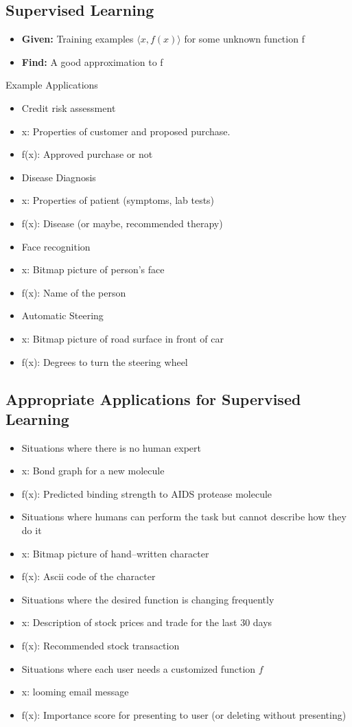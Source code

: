 \subsection{Supervised Learning}
\begin{itemize}
  \item \textbf{Given:} Training examples $\langle x,f(x)\rangle$ for some unknown function f
  \item \textbf{Find:} A good approximation to f
\end{itemize}
Example Applications
\begin{itemize}
  \item Credit risk assessment
  \item[] x: Properties of customer and proposed purchase.
  \item[] f(x): Approved purchase or not
  \item Disease Diagnosis
  \item[] x: Properties of patient (symptoms, lab tests)
  \item[] f(x): Disease (or maybe, recommended therapy)
  \item Face recognition
  \item[] x: Bitmap picture of person's face
  \item[] f(x): Name of the person
  \item Automatic Steering
  \item[] x: Bitmap picture of road surface in front of car
  \item[] f(x): Degrees to turn the steering wheel
\end{itemize}

\subsection{Appropriate Applications for Supervised Learning}
\begin{itemize}
  \item Situations where there is no human expert
  \item[]x: Bond graph for a new molecule
  \item[]f(x): Predicted binding strength to AIDS protease molecule
  \item Situations where humans can perform the task but cannot describe how they do it
  \item[]x: Bitmap picture of hand--written character
  \item[]f(x): Ascii code of the character
  \item Situations where the desired function is changing frequently
  \item[]x: Description of stock prices and trade for the last 30 days
  \item[]f(x): Recommended stock transaction
  \item Situations where each user needs a customized function $f$
  \item[]x: looming email message
  \item[]f(x): Importance score for presenting to user (or deleting without presenting)
\end{itemize}

